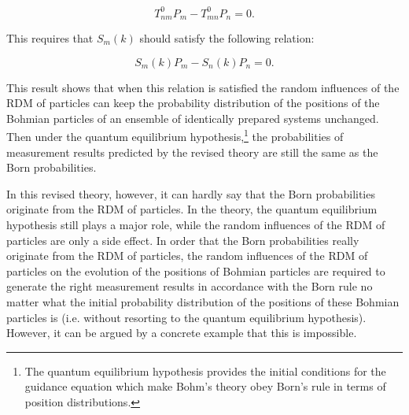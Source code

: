 \begin{equation}
T^0_{nm}P_m-T^0_{mn}P_n=0.
\end{equation}

\noindent This requires that  $S_{m}(k)$ should satisfy the following relation:

\begin{equation}
S_{m}(k)P_m-S_{n}(k)P_n=0.
\end{equation}

\noindent This result shows that when this relation is satisfied the random influences of the RDM of particles can keep the probability distribution of the positions of the Bohmian particles of an ensemble of identically prepared systems unchanged.
Then under the quantum equilibrium hypothesis,\footnote{The quantum equilibrium hypothesis provides the initial conditions for the guidance equation which make Bohm's theory obey Born's rule in terms of position distributions.}  the probabilities of measurement results predicted by the revised theory are still the same as the Born probabilities.

In this revised theory, however, it can hardly say that the Born probabilities originate from the RDM of particles. In the theory, the quantum equilibrium hypothesis still plays a major role, while the random influences of the RDM of particles are only a side effect.
In order that the Born probabilities really originate from the RDM of particles, 
the random influences of the RDM of particles on the evolution of the positions of Bohmian particles are required to generate the right measurement results in accordance with the Born rule no matter what the initial probability distribution of the positions of these Bohmian particles is (i.e. without resorting to the quantum equilibrium hypothesis).
However, it can be argued by a concrete example that this is impossible.

